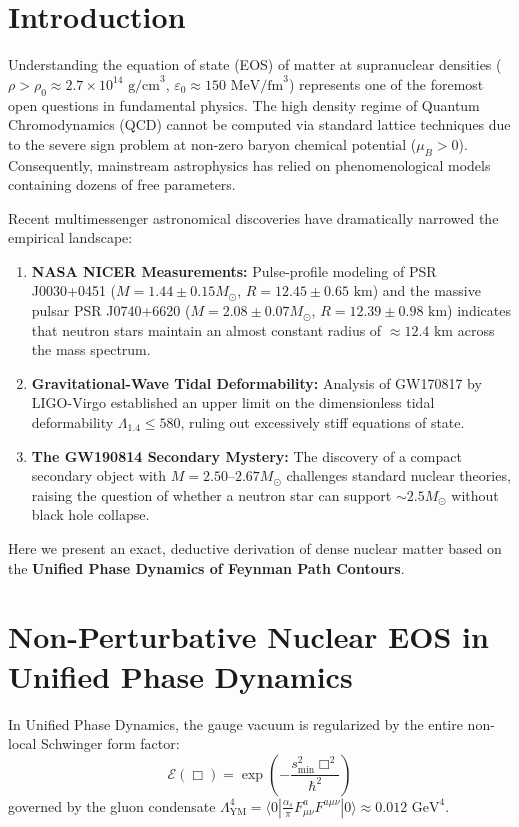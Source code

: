 \documentclass[11pt,a4paper]{article}
\begin{document}
\section{Introduction}
Understanding the equation of state (EOS) of matter at supranuclear densities ($\rho > \rho_0 \approx 2.7 \times 10^{14}\text{ g/cm}^3$, $\varepsilon_0 \approx 150\text{ MeV/fm}^3$) represents one of the foremost open questions in fundamental physics. The high density regime of Quantum Chromodynamics (QCD) cannot be computed via standard lattice techniques due to the severe sign problem at non-zero baryon chemical potential ($\mu_B > 0$). Consequently, mainstream astrophysics has relied on phenomenological models containing dozens of free parameters.

Recent multimessenger astronomical discoveries have dramatically narrowed the empirical landscape:
\begin{enumerate}
    \item \textbf{NASA NICER Measurements:} Pulse-profile modeling of PSR J0030+0451 ($M = 1.44 \pm 0.15 M_\odot$, $R = 12.45 \pm 0.65\text{ km}$) and the massive pulsar PSR J0740+6620 ($M = 2.08 \pm 0.07 M_\odot$, $R = 12.39 \pm 0.98\text{ km}$) indicates that neutron stars maintain an almost constant radius of $\approx 12.4\text{ km}$ across the mass spectrum.
    \item \textbf{Gravitational-Wave Tidal Deformability:} Analysis of GW170817 by LIGO-Virgo established an upper limit on the dimensionless tidal deformability $\Lambda_{1.4} \le 580$, ruling out excessively stiff equations of state.
    \item \textbf{The GW190814 Secondary Mystery:} The discovery of a compact secondary object with $M = 2.50\text{--}2.67 M_\odot$ challenges standard nuclear theories, raising the question of whether a neutron star can support $\sim 2.5 M_\odot$ without black hole collapse.
\end{enumerate}

Here we present an exact, deductive derivation of dense nuclear matter based on the \textbf{Unified Phase Dynamics of Feynman Path Contours}.

\section{Non-Perturbative Nuclear EOS in Unified Phase Dynamics}
In Unified Phase Dynamics, the gauge vacuum is regularized by the entire non-local Schwinger form factor:
\begin{equation}
\mathcal{E}(\Box) = \exp\left(-\frac{s_{\min}^2 \Box^2}{\hbar^2}\right)
\end{equation}
governed by the gluon condensate $\Lambda_{\text{YM}}^4 = \langle 0 | \frac{\alpha_s}{\pi} F_{\mu\nu}^a F^{a\mu\nu} | 0 \rangle \approx 0.012\text{ GeV}^4$. 
\end{document}
